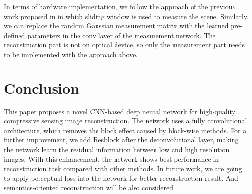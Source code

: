 \documentclass[review]{elsarticle}
\begin{document}
In terms of hardware implementation, we follow the approach of the previous work proposed in \cite{shi2011high} in which sliding window is used to measure the scene. Similarly, we can replace the random Gaussian measurement matrix with the learned pre-defined  parameters in the conv layer of the measurement network. The reconstruction part is not on optical device, so only the measurement part needs to be implemented with the approach above.

\section{Conclusion}\label{Conclusion}\label{conclusion}
This paper proposes a novel CNN-based deep neural network for high-quality compressive sensing image reconstruction. The network uses a fully convolutional architecture, which removes the block effect caused by block-wise methods. For a further improvement, we add Resblock after the deconvolutional layer, making the network learn the residual information between low and high resolution images. With this enhancement, the network shows best performance in reconstruction task compared with other methods. In future work, we are going to apply perceptual loss into the network for better reconstruction result. And semantics-oriented reconstruction will be also considered.



\end{document}
